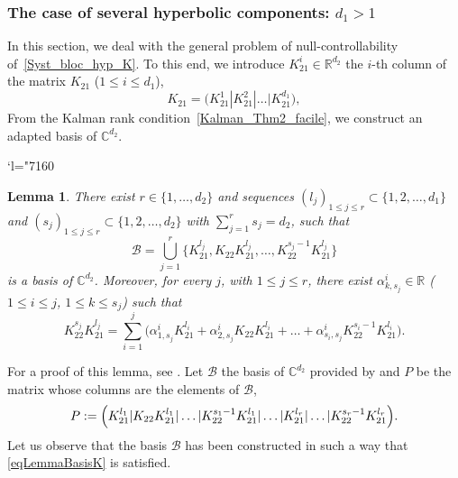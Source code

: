 \documentclass[10pt]{amsart}
\let\mathcal\mathscr
\newcommand{\Changel}{\mathcode`l="7160}
\theoremstyle{plain}
\newtheorem{lemma}[theorem]{Lemma}
\theoremstyle{definition}
\theoremstyle{remark}
\newcommand{\set}{\mathbb}
\newcommand{\R}{} %
\renewcommand{\R}{\set{R}}
\renewcommand{\C}{\set{C}}
\newcommand{\coloneqq}{\mathrel{\mathord{:}\mathord=}}
\begin{document}
\subsubsection{The case of several hyperbolic components: $d_1 >1$}
\label{SectionKd1>1}

In this section, we deal with the general problem of null-controllability of~\eqref{Syst_bloc_hyp_K}. To this end, we introduce $K_{21}^i \in \R^{d_2}$ the $i$-th column of the matrix $K_{21}$ ($1 \leq i \leq d_1$), \ie
\[
K_{21} = \bigl(K_{21}^1 | K_{21}^2 | \dots | K_{21}^{d_1} \bigr),
\]
From the Kalman rank condition~\eqref{Kalman_Thm2_facile}, we construct an adapted basis of $\C^{d_2}$.

\Changel

\begin{lemma}
\label{AdaptedBasisLemma}
There exist $r \in \{1, \dots, d_2\}$ and sequences $(l_j)_{1 \leq j \leq r} \subset \{1, 2, \dots, d_1\}$ and $(s_j)_{1 \leq j \leq r} \subset \{1, 2, \dots, d_2\}$ with $\sum_{j=1}^r s_j =d_2$, such that
\[
\mathcal{B} = \bigcup\limits_{j=1}^{r} \bigl\{K_{21}^{l_j}, K_{22} K_{21}^{l_j}, \dots, K_{22}^{s_j-1} K_{21}^{l_j} \bigr\}
\]
is a basis of $\C^{d_2}$. Moreover, for every $j$, with $1 \leq j \leq r$, there exist $\alpha_{k,s_j}^i \in \R$ ($1 \leq i \leq j$, $1 \leq k \leq s_j$) such that
\begin{equation}
K_{22}^{s_j} K_{21}^{l_j} = \sum_{i=1}^j \bigl(\alpha_{1, s_j}^i K_{21}^{l_i} + \alpha_{2, s_j}^i K_{22} K_{21}^{l_i} + \dots + \alpha_{s_i,s_j}^i K_{22}^{s_i-1} K_{21}^{l_i}\bigr).
\label{eqLemmaBasisK}
\end{equation}
\end{lemma}

For a proof of this lemma, see \cite[Lem.\,3.1]{ammarkhodja_2009a}. Let $\mathcal{B}$ the basis of $\C^{d_2}$ provided by  and $P$ be the matrix whose columns are the elements of $\mathcal{B}$, \ie
\[
P \coloneqq \Bigl(K_{21}^{l_1} | K_{22} K_{21}^{l_1} | \dots | K_{22}^{s_1-1} K_{21}^{l_1}| \dots | K_{21}^{l_r} | \dots | K_{22}^{s_r-1} K_{21}^{l_r} \Bigr).
\]
Let us observe that the basis $\mathcal{B}$ has been constructed in such a way that \eqref{eqLemmaBasisK} is satisfied.
\end{document}
